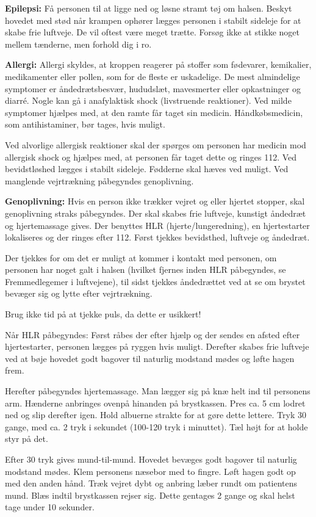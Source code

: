 \textbf{Epilepsi:} Få personen til at ligge ned og løsne stramt tøj om halsen.  Beskyt hovedet med stød når krampen ophører lægges personen i stabilt sideleje for at skabe frie luftveje. De vil oftest være meget trætte. Forsøg ikke at stikke noget mellem tænderne, men forhold dig i ro. 


\textbf{Allergi:} Allergi skyldes, at kroppen reagerer på stoffer som fødevarer, kemikalier, medikamenter eller pollen, som for de fleste er uskadelige. De mest almindelige symptomer er åndedrætsbesvær, hududslæt, mavesmerter eller opkastninger og diarré. Nogle kan gå i anafylaktisk shock (livstruende reaktioner). 
Ved milde symptomer hjælpes med, at den ramte får taget sin medicin. Håndkøbsmedicin, som antihistaminer, bør tages, hvis muligt.

Ved alvorlige allergisk reaktioner skal der spørges om personen har medicin mod allergisk shock og hjælpes med, at personen får taget dette og ringes 112. Ved bevidstløshed lægges i stabilt sideleje. Fødderne skal hæves ved muligt. Ved manglende vejrtrækning påbegyndes genoplivning.


\textbf{Genoplivning:} Hvis en person ikke trækker vejret og eller hjertet stopper, skal genoplivning straks påbegyndes. Der skal skabes frie luftveje, kunstigt åndedræt og hjertemassage gives. Der benyttes HLR (hjerte/lungeredning), en hjertestarter lokaliseres og der ringes efter 112.
Først tjekkes bevidsthed, luftveje og åndedræt.


Der tjekkes for om det er muligt at kommer i kontakt med personen, om personen har noget galt i halsen (hvilket fjernes inden HLR påbegyndes, se Fremmedlegemer i luftvejene), til sidst tjekkes åndedrættet ved at se om brystet bevæger sig og lytte efter vejrtrækning. 


Brug ikke tid på at tjekke puls, da dette er usikkert!


Når HLR påbegyndes: Først råbes der efter hjælp og der sendes en afsted efter hjertestarter, personen lægges på ryggen hvis muligt. Derefter skabes frie luftveje ved at bøje hovedet godt bagover til naturlig modstand mødes og løfte hagen frem.


Herefter påbegyndes hjertemassage. Man lægger sig på knæ helt ind til personens arm. Hænderne anbringes ovenpå hinanden på brystkassen. Pres ca. 5 cm lodret ned og slip derefter igen. Hold albuerne strakte for at gøre dette lettere. Tryk 30 gange, med ca. 2 tryk i sekundet (100-120 tryk i minuttet). Tæl højt for at holde styr på det.


Efter 30 tryk gives mund-til-mund. Hovedet bevæges godt bagover til naturlig modstand mødes. Klem personens næsebor med to fingre. Løft hagen godt op med den anden hånd. Træk vejret dybt og anbring læber rundt om patientens mund. Blæs indtil brystkassen rejser sig. Dette gentages 2 gange og skal helst tage under 10 sekunder.



